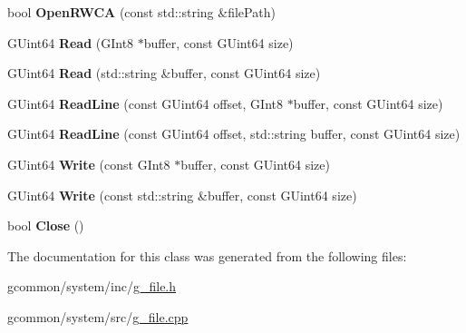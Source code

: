 \begin{DoxyCompactItemize}
\item 
\hypertarget{class_file_ad7a699de8ce39a63a413959d21c6423f}{bool {\bfseries Open\-R\-W\-C\-A} (const std\-::string \&file\-Path)}\label{class_file_ad7a699de8ce39a63a413959d21c6423f}

\item 
\hypertarget{class_file_aea9f4154a56abd7f1d302bf63b7ceb93}{G\-Uint64 {\bfseries Read} (G\-Int8 $\ast$buffer, const G\-Uint64 size)}\label{class_file_aea9f4154a56abd7f1d302bf63b7ceb93}

\item 
\hypertarget{class_file_afcc79800a94cd3045aa7f8b8574471f0}{G\-Uint64 {\bfseries Read} (std\-::string \&buffer, const G\-Uint64 size)}\label{class_file_afcc79800a94cd3045aa7f8b8574471f0}

\item 
\hypertarget{class_file_a707692fefadfabfcde6b2bcb01e82f4d}{G\-Uint64 {\bfseries Read\-Line} (const G\-Uint64 offset, G\-Int8 $\ast$buffer, const G\-Uint64 size)}\label{class_file_a707692fefadfabfcde6b2bcb01e82f4d}

\item 
\hypertarget{class_file_ad20bb2403e990f8b067ee6dde959c36b}{G\-Uint64 {\bfseries Read\-Line} (const G\-Uint64 offset, std\-::string buffer, const G\-Uint64 size)}\label{class_file_ad20bb2403e990f8b067ee6dde959c36b}

\item 
\hypertarget{class_file_ab537660ec7c944523fb1bb76c27c0658}{G\-Uint64 {\bfseries Write} (const G\-Int8 $\ast$buffer, const G\-Uint64 size)}\label{class_file_ab537660ec7c944523fb1bb76c27c0658}

\item 
\hypertarget{class_file_a48321c6fa8dc3d6577f407bbee1e6f59}{G\-Uint64 {\bfseries Write} (const std\-::string \&buffer, const G\-Uint64 size)}\label{class_file_a48321c6fa8dc3d6577f407bbee1e6f59}

\item 
\hypertarget{class_file_ad7ab440b2fba02aa291ecf5a00de8b8d}{bool {\bfseries Close} ()}\label{class_file_ad7ab440b2fba02aa291ecf5a00de8b8d}

\end{DoxyCompactItemize}


The documentation for this class was generated from the following files\-:\begin{DoxyCompactItemize}
\item 
gcommon/system/inc/\hyperlink{g__file_8h}{g\-\_\-file.\-h}\item 
gcommon/system/src/\hyperlink{g__file_8cpp}{g\-\_\-file.\-cpp}\end{DoxyCompactItemize}
